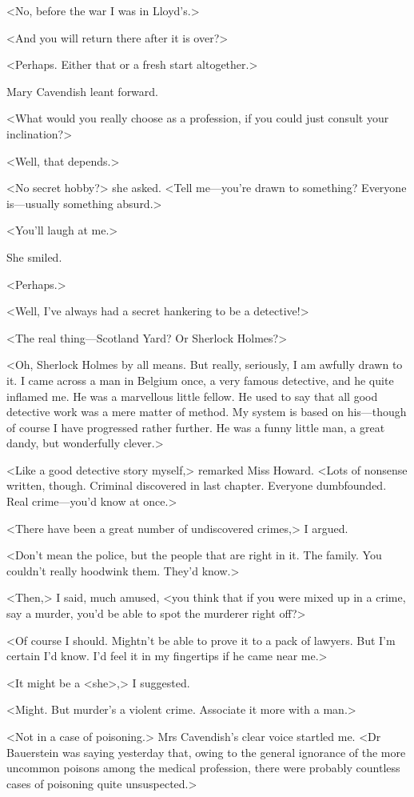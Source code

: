  <No, before the war I was in Lloyd's.> 

 <And you will return there after it is over?> 

 <Perhaps. Either that or a fresh start altogether.> 

 Mary Cavendish leant forward. 

 <What would you really choose as a profession, if you could just consult your inclination?> 

 <Well, that depends.> 

 <No secret hobby?> she asked. <Tell me—you're drawn to something? Everyone is—usually something absurd.> 

 <You'll laugh at me.> 

 She smiled. 

 <Perhaps.> 

 <Well, I've always had a secret hankering to be a detective!> 

 <The real thing—Scotland Yard? Or Sherlock Holmes?> 

 <Oh, Sherlock Holmes by all means. But really, seriously, I am awfully drawn to it. I came across a man in Belgium once, a very famous detective, and he quite inflamed me. He was a marvellous little fellow. He used to say that all good detective work was a mere matter of method. My system is based on his—though of course I have progressed rather further. He was a funny little man, a great dandy, but wonderfully clever.> 

 <Like a good detective story myself,> remarked Miss Howard. <Lots of nonsense written, though. Criminal discovered in last chapter. Everyone dumbfounded. Real crime—you'd know at once.> 

 <There have been a great number of undiscovered crimes,> I argued. 

 <Don't mean the police, but the people that are right in it. The family. You couldn't really hoodwink them. They'd know.> 

 <Then,> I said, much amused, <you think that if you were mixed up in a crime, say a murder, you'd be able to spot the murderer right off?> 

 <Of course I should. Mightn't be able to prove it to a pack of lawyers. But I'm certain I'd know. I'd feel it in my fingertips if he came near me.> 

 <It might be a <she>,> I suggested. 

 <Might. But murder's a violent crime. Associate it more with a man.> 

 <Not in a case of poisoning.> Mrs Cavendish's clear voice startled me. <Dr Bauerstein was saying yesterday that, owing to the general ignorance of the more uncommon poisons among the medical profession, there were probably countless cases of poisoning quite unsuspected.> 

